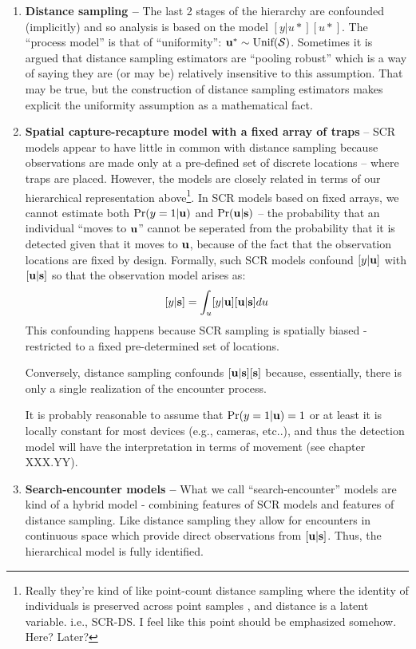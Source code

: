 \begin{enumerate}
\item {\bf Distance sampling -- } The last 2 stages of the hierarchy
  are confounded (implicitly) and so analysis is based on the model
  $[y|u*] [u*]$. The ``process model'' is that of ``uniformity'': ${\bf u}^{*}
  \sim \text{Unif}({\cal S})$. Sometimes it is argued that distance sampling
  estimators are ``pooling robust'' which is a way of saying they are
  (or may be)
  relatively insensitive to this assumption. That may be true, but the
  construction of distance sampling estimators makes explicit the
  uniformity assumption as a mathematical fact.

\item {\bf Spatial capture-recapture model with a fixed array of traps} --
SCR models appear to have little in common with distance sampling
because observations are made only at a pre-defined set of discrete
locations -- where traps are placed. However, the models are closely
related in terms of our hierarchical representation above\footnote{Really
they're kind of like point-count distance sampling where the identity
of individuals is preserved across point samples , and distance is a
latent variable. i.e., SCR-DS. I feel like this point should be
emphasized somehow. Here? Later?}.
In SCR models based on fixed arrays,
we cannot estimate both
$\Pr(y=1|{\bf u})$ and $\Pr({\bf u}|{\bf s})$ -- the probability  that
an individual ``moves to ${\bf u}$'' cannot be seperated from the
probability that it is detected given that it moves to ${\bf u}$,
because of the fact that the observation locations are fixed by
design.
Formally, such SCR models confound $[y|{\bf u}]$  with $[{\bf
  u}|{\bf s}]$ so that the observation model arises as:
\[
 [y|{\bf s}] = \int_{u} [y|{\bf u}][{\bf u}|{\bf s}] du
\]
This confounding happens because SCR sampling is spatially biased -
restricted to a fixed pre-determined set of locations.

Conversely,
distance sampling confounds $[{\bf u}|{\bf s}][{\bf s}]$ because, essentially, there is
only a single realization of the encounter process.

It is probably
reasonable to assume that $\Pr(y=1|{\bf u})=1$ or at least it is locally
constant for most devices (e.g., cameras, etc..), and thus the
detection model will have the interpretation in terms of movement (see
chapter XXX.YY).

\item {\bf Search-encounter models -- } What we call
  ``search-encounter'' models \citep{royle_etal:2011mee}
  are kind of a hybrid model - combining features of SCR models and
  features of distance sampling. Like distance sampling they allow for
  encounters in continuous space which provide direct observations
  from $[{\bf u}|{\bf s}]$.
Thus, the
  hierarchical model is fully identified.


\end{enumerate}
